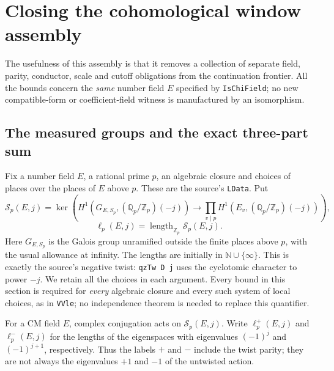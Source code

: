 \section{Closing the cohomological window assembly}\label{sec:cohomological-window-closure}


The usefulness of this assembly is that it removes a collection of
separate field, parity, conductor, scale and cutoff obligations from the
continuation frontier.  All the bounds concern the \emph{same} number
field $E$ specified by \texttt{IsChiField}; no new compatible-form or
coefficient-field witness is manufactured by an isomorphism.

\subsection{The measured groups and the exact three-part sum}

Fix a number field $E$, a rational prime $p$, an algebraic closure and
choices of places over the places of $E$ above $p$.  These are the
source's \texttt{LData}.  Put
\[
 \mathscr S_p(E,j)=\ker\!\left(
 H^1(G_{E,S_p},(\mathbb Q_p/\mathbb Z_p)(-j))
 \longrightarrow\prod_{v\mid p}
 H^1(E_v,(\mathbb Q_p/\mathbb Z_p)(-j))\right),
\]\[
 \ell_p(E,j)=\operatorname{length}_{\mathbb Z_p}\mathscr S_p(E,j).
\]
Here $G_{E,S_p}$ is the Galois group unramified outside the finite places
above $p$, with the usual allowance at infinity.  The lengths are initially
in $\mathbb N\cup\{\infty\}$.  This is exactly the source's negative twist:
\texttt{qzTw D j} uses the cyclotomic character to power $-j$.
We retain all the choices in each argument.  Every bound in this section
is required for \emph{every} algebraic closure and every such system of
local choices, as in \texttt{VVle}; no independence theorem is needed to
replace this quantifier.

For a CM field $E$, complex conjugation acts on $\mathscr S_p(E,j)$.
Write $\ell_p^+(E,j)$ and $\ell_p^-(E,j)$ for the lengths of the
eigenspaces with eigenvalues $(-1)^j$ and $(-1)^{j+1}$, respectively.
Thus the labels $+$ and $-$ include the twist parity; they are not
always the eigenvalues $+1$ and $-1$ of the untwisted action.


